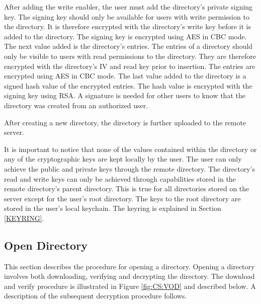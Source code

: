 \documentclass[pdftex,english,10pt,b5paper,twoside]{book}
\begin{document}
After adding the write enabler, the user must add the directory's private
signing key. The signing key should only be available for users with write
permission to the directory. It is therefore encrypted with the directory's
write key before it is added to the directory. The signing key is encrypted using \ac{AES} in
\ac{CBC} mode. The next value added is the directory's entries. The entries of a
directory should only be visible to users with read permissions to
the directory. They are therefore encrypted with the directory's \ac{IV} and read
key prior to insertion. The entries are encrypted using \ac{AES} in \ac{CBC} mode. The
last value added to the directory is a signed hash value of the encrypted
entries. The hash value is encrypted with the signing key using \ac{RSA}. A
signature is needed for other users to know that the directory was created from
an authorized user.

After creating a new directory, the directory is further uploaded to the remote
server.

It is important to notice that none of the values contained within the
directory or any of the cryptographic keys are kept locally by the user. The
user can only achieve the public and private keys through the remote directory.
The directory's read and write keys can only be achieved through capabilities stored
in the remote directory's parent directory. This is true for all directories
stored on the server except for the user's root directory. The keys to the
root directory are stored in the user's local keychain. The keyring is explained
in Section \ref{KEYRING}.

\subsection{Open Directory}

This section describes the procedure for opening a directory. Opening a
directory involves both downloading, verifying and decrypting the directory. The
download and verify procedure is illustrated in Figure \ref{fig:CS:VOD} and
described below. A description of the subsequent decryption procedure follows.
\end{document}

